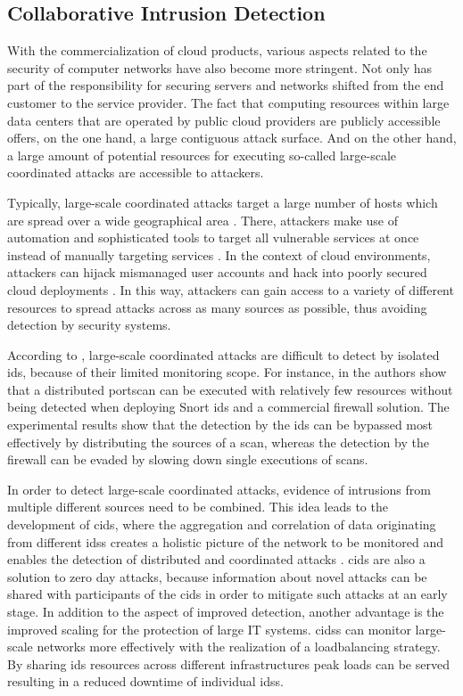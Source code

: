 \subsection{Collaborative Intrusion Detection}
With the commercialization of cloud products, various aspects related to the security of computer networks have also become more stringent. Not only has part of the responsibility for securing servers and networks shifted from the end customer to the service provider. The fact that computing resources within large data centers that are operated by public cloud providers are publicly accessible offers, on the one hand, a large contiguous attack surface. And on the other hand, a large amount of potential resources for executing so-called large-scale coordinated attacks are accessible to attackers. 

Typically, large-scale coordinated attacks target a large number of hosts which are spread over a wide geographical area \cite{Zhou2010}.
There, attackers make use of automation and sophisticated tools to target all vulnerable services at once instead of manually targeting services \cite{savage2005}. In the context of cloud environments, attackers can hijack mismanaged user accounts and hack into poorly secured cloud deployments \cite{kumar2019}. In this way, attackers can gain access to a variety of different resources to spread attacks across as many sources as possible, thus avoiding detection by security systems.

According to \cite{Zhou2010}, large-scale coordinated attacks are difficult to detect by isolated \gls{ids}, because of their limited monitoring scope. For instance, in \cite{riquet2012large} the authors show that a distributed portscan can be executed with relatively few resources without being detected when deploying Snort \gls{ids} and a commercial firewall solution. The experimental results show that the detection by the \gls{ids} can be bypassed most effectively by distributing the sources of a scan, whereas the detection by the firewall can be evaded by slowing down single executions of scans. 

In order to detect large-scale coordinated attacks, evidence of intrusions from multiple different sources need to be combined. This idea leads to the development of \gls{cids}, where the aggregation and correlation of data originating from different \glspl{ids} creates a holistic picture of the network to be monitored and enables the detection of distributed and coordinated attacks \cite[24]{vasilomanolakis_collaborative_2016}. \gls{cids} are also a solution to zero day attacks, because information about novel attacks can be shared with participants of the \gls{cids} in order to mitigate such attacks at an early stage. In addition to the aspect of improved detection, another advantage is the improved scaling for the protection of large IT systems. \glspl{cids} can monitor large-scale networks more effectively with the realization of a loadbalancing strategy. By sharing \gls{ids} resources across different infrastructures peak loads can be served resulting in a reduced downtime of individual \glspl{ids}.

